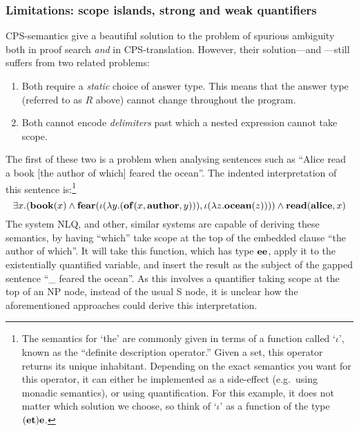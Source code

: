 \subsubsection{Limitations: scope islands, strong and weak quantifiers}
\label{sec:limitations-scope-islands-strong-and-weak-quantifiers}
 CPS-semantics give a beautiful solution to the
problem of spurious ambiguity both in proof search \emph{and} in
CPS-translation. However, their solution---and
---still suffers from two related problems:
\begin{enumerate}
\item Both require a \emph{static} choice of answer type. This
  means that the answer type (referred to as $R$ above) cannot change
  throughout the program.
\item Both cannot encode \emph{delimiters} past which a nested
  expression cannot take scope.
\end{enumerate}

The first of these two is a problem when analysing sentences such as
``Alice read a book [the author of which] feared the ocean''. The
indented interpretation of this sentence is:\footnote{%
  The semantics for `the' are commonly given in terms of a function
  called `$\iota$', known as the ``definite description operator.''
  Given a set, this operator returns its unique inhabitant. Depending
  on the exact semantics you want for this operator, it can either be
  implemented as a side-effect (e.g.\ using monadic semantics), or
  using quantification. For this example, it does not matter which
  solution we choose, so think of `$\iota$' as a function of the type
  $(\mathbf{e}\mathbf{t})\mathbf{e}$.
}
\[
  \exists x.(\mathbf{book}(x)\wedge \mathbf{fear}(\iota(\lambda
  y.(\mathbf{of}(x,\mathbf{author},y))),\iota(\lambda z.\mathbf{ocean}(z))))\wedge\mathbf{read}(\mathbf{alice},x)
\]
The system NLQ, and other, similar systems are capable of deriving
these semantics, by having ``which'' take scope at the top of the
embedded clause ``the author of which''. It will take this function,
which has type $\mathbf{e}\mathbf{e}$, apply it to the existentially quantified
variable, and insert the result as the subject of the gapped sentence
``\_ feared the ocean''. As this involves a quantifier taking scope at
the top of an NP node, instead of the usual S node, it is unclear how
the aforementioned approaches could derive this interpretation.

